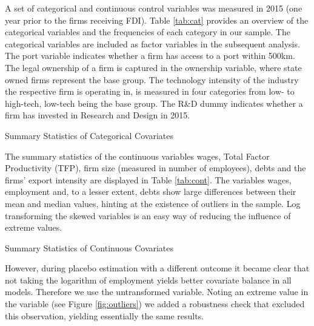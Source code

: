 \documentclass[a4paper,11pt]{scrartcl}
\begin{document}
A set of categorical and continuous control variables was measured in 2015 (one year prior to the firms receiving FDI). Table \ref{tab:cat} provides an overview of the categorical variables and the frequencies of each category in our sample. The categorical variables are included as factor variables in the subsequent analysis. The port variable indicates whether a firm has access to a port within 500km. The legal ownership of a firm is captured in the ownership variable, where state owned firms represent the base group. The technology intensity of the industry the respective firm is operating in, is measured in four categories from low- to high-tech, low-tech being the base group. The R\&D dummy indicates whether a firm has invested in Research and Design in 2015. \\

\begin{table}[h]
	\centering
	\caption{Summary Statistics of Categorical Covariates} 
	
	\label{tab:cat}	
\end{table}

The summary statistics of the continuous variables wages, Total Factor Productivity (TFP), firm size (measured in number of employees), debts and the firms' export intensity are displayed in Table \ref{tab:cont}. The variables wages, employment and, to a lesser extent, debts show large differences between their mean and median values, hinting at the existence of outliers in the sample. Log transforming the skewed variables is an easy way of reducing the influence of extreme values. 

\begin{table}[h]
	\centering
	\caption{Summary Statistics of Continuous Covariates} 
	
	\label{tab:cont}
\end{table}

However, during placebo estimation with a different outcome it became clear that not taking the logarithm of employment yields better covariate balance in all models. Therefore we use the untransformed variable. Noting an extreme value in the variable (see Figure \ref{fig:outliers}) we added a robustness check that excluded this observation, yielding essentially the same results. 
 
\end{document}
